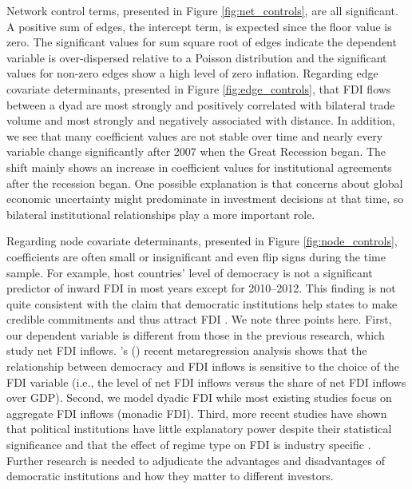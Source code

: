 \documentclass[reqno,onecolumn,letterpaper,12pt]{article}
\newcommand\citeapos[1]{\citeauthor{#1}'s (\citeyear{#1})}
\begin{document}
Network control terms, presented in Figure \ref{fig:net_controls}, are all significant. A positive sum of edges, the intercept term, is expected since the floor value is zero. The significant values for sum square root of edges indicate the dependent variable is over-dispersed relative to a Poisson distribution and the significant values for non-zero edges show a high level of zero inflation. Regarding edge covariate determinants, presented in Figure \ref{fig:edge_controls}, that FDI flows between a dyad are most strongly and positively correlated with bilateral trade volume and most strongly and negatively associated with distance. In addition, we see that many coefficient values are not stable over time and nearly every variable change significantly after 2007 when the Great Recession began. The shift mainly shows an increase in coefficient values for institutional agreements after the recession began. One possible explanation is that concerns about global economic uncertainty might predominate in investment decisions at that time, so bilateral institutional relationships play a more important role.

Regarding node covariate determinants, presented in Figure \ref{fig:node_controls}, coefficients are often small or insignificant and even flip signs during the time sample. %
For example, host countries' level of democracy is not a significant predictor of inward FDI in most years except for 2010--2012. This finding is not quite consistent with the claim that democratic institutions help states to make credible commitments and thus attract FDI \cite[e.g.,][]{Jensen:2003,Henisz:2000}. We note three points here. First, our dependent variable is different from those in the previous research, which study net FDI inflows. \citeapos{Li_et_al:2018} recent metaregression analysis shows that the relationship between democracy and FDI inflows is sensitive to the choice of the FDI variable (i.e., the level of net FDI inflows versus the share of net FDI inflows over GDP). Second, we model dyadic FDI while most existing studies focus on aggregate FDI inflows (monadic FDI). Third, more recent studies have shown that political institutions have little explanatory power despite their statistical significance \citep{Arel-Bundock:2017b} and that the effect of regime type on FDI is industry specific \citep{Wright_Zhu:2018}. Further research is needed to adjudicate the advantages and disadvantages of democratic institutions and how they matter to different investors.
\end{document}

